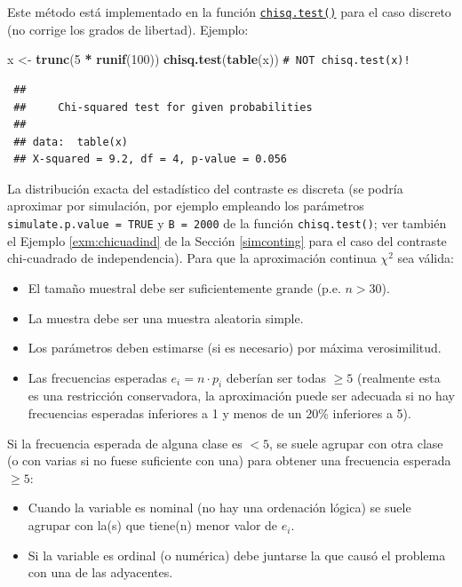 \documentclass[
  spanish,
  10pt,
]{book}
\newenvironment{Shaded}{\begin{snugshade}}{\end{snugshade}}
\newcommand{\CommentTok}[1]{\textcolor[rgb]{0.56,0.35,0.01}{\textit{#1}}}
\newcommand{\DecValTok}[1]{\textcolor[rgb]{0.00,0.00,0.81}{#1}}
\newcommand{\FunctionTok}[1]{\textcolor[rgb]{0.13,0.29,0.53}{\textbf{#1}}}
\newcommand{\NormalTok}[1]{#1}
\newcommand{\OtherTok}[1]{\textcolor[rgb]{0.56,0.35,0.01}{#1}}
\newcommand{\SpecialCharTok}[1]{\textcolor[rgb]{0.81,0.36,0.00}{\textbf{#1}}}
\theoremstyle{break}
\theoremstyle{nonumberplain}
\renewcommand{\CommentTok}[1]{\textcolor[rgb]{0.41,0.41,0.41}{\texttt{#1}}}
\begin{document}
Este método está implementado en la función \href{https://rdrr.io/r/stats/chisq.test.html}{\texttt{chisq.test()}} para el caso discreto (no corrige los grados de libertad).
Ejemplo:

\begin{Shaded}
\begin{Highlighting}[]
\NormalTok{x }\OtherTok{\textless{}{-}} \FunctionTok{trunc}\NormalTok{(}\DecValTok{5} \SpecialCharTok{*} \FunctionTok{runif}\NormalTok{(}\DecValTok{100}\NormalTok{))}
\FunctionTok{chisq.test}\NormalTok{(}\FunctionTok{table}\NormalTok{(x))            }\CommentTok{\# NOT \textquotesingle{}chisq.test(x)\textquotesingle{}!}
\end{Highlighting}
\end{Shaded}

\begin{verbatim}
 ## 
 ##     Chi-squared test for given probabilities
 ## 
 ## data:  table(x)
 ## X-squared = 9.2, df = 4, p-value = 0.056
\end{verbatim}

La distribución exacta del estadístico del contraste es discreta (se podría aproximar por simulación, por ejemplo empleando los parámetros \texttt{simulate.p.value\ =\ TRUE} y \texttt{B\ =\ 2000} de la función \texttt{chisq.test()}; ver también el Ejemplo \ref{exm:chicuadind} de la Sección \ref{simconting} para el caso del contraste chi-cuadrado de independencia).
Para que la aproximación continua \(\chi^2\) sea válida:

\begin{itemize}
\item
  El tamaño muestral debe ser suficientemente grande (p.e. \(n>30\)).
\item
  La muestra debe ser una muestra aleatoria simple.
\item
  Los parámetros deben estimarse (si es necesario) por máxima
  verosimilitud.
\item
  Las frecuencias esperadas \(e_{i}=n\cdot p_{i}\) deberían ser todas
  \(\geq5\) (realmente esta es una restricción conservadora, la aproximación
  puede ser adecuada si no hay frecuencias esperadas inferiores a 1 y
  menos de un 20\% inferiores a 5).
\end{itemize}

Si la frecuencia esperada de alguna clase es \(<5\), se suele agrupar con otra
clase (o con varias si no fuese suficiente con una) para obtener una
frecuencia esperada \(\geq5\):

\begin{itemize}
\item
  Cuando la variable es nominal (no hay una ordenación lógica) se
  suele agrupar con la(s) que tiene(n) menor valor de \(e_{i}\).
\item
  Si la variable es ordinal (o numérica) debe juntarse la que causó el
  problema con una de las adyacentes.
\end{itemize}
\end{document}
